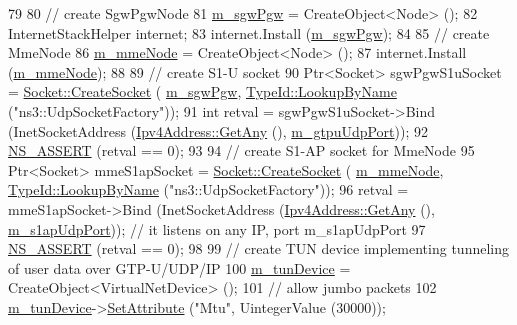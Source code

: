 \begin{DoxyCode}
79   
80   \textcolor{comment}{// create SgwPgwNode}
81   \hyperlink{classns3_1_1MmWavePointToPointEpcHelper_a164b7ce64e19868995296d492e7ddd21}{m\_sgwPgw} = CreateObject<Node> ();
82   InternetStackHelper internet;
83   internet.Install (\hyperlink{classns3_1_1MmWavePointToPointEpcHelper_a164b7ce64e19868995296d492e7ddd21}{m\_sgwPgw});
84 
85   \textcolor{comment}{// create MmeNode}
86   \hyperlink{classns3_1_1MmWavePointToPointEpcHelper_a4e2e32e1abb0ca817e30be4eb46ebfd0}{m\_mmeNode} = CreateObject<Node> ();
87   internet.Install (\hyperlink{classns3_1_1MmWavePointToPointEpcHelper_a4e2e32e1abb0ca817e30be4eb46ebfd0}{m\_mmeNode});
88   
89   \textcolor{comment}{// create S1-U socket}
90   Ptr<Socket> sgwPgwS1uSocket = \hyperlink{classns3_1_1Socket_ad448a62bb50ad3dbac59c879a885a8d2}{Socket::CreateSocket} (
      \hyperlink{classns3_1_1MmWavePointToPointEpcHelper_a164b7ce64e19868995296d492e7ddd21}{m\_sgwPgw}, \hyperlink{classns3_1_1TypeId_a119cf99c20931fdc294602cd360b180e}{TypeId::LookupByName} (\textcolor{stringliteral}{"ns3::UdpSocketFactory"}));
91   \textcolor{keywordtype}{int} retval = sgwPgwS1uSocket->Bind (InetSocketAddress (\hyperlink{classns3_1_1Ipv4Address_a7a39b330c8e701183a411d5779fca1a4}{Ipv4Address::GetAny} (), 
      \hyperlink{classns3_1_1MmWavePointToPointEpcHelper_af751b4022bf80a9ea76f18805534a9d0}{m\_gtpuUdpPort}));
92   \hyperlink{assert_8h_a6dccdb0de9b252f60088ce281c49d052}{NS\_ASSERT} (retval == 0);
93 
94   \textcolor{comment}{// create S1-AP socket for MmeNode}
95   Ptr<Socket> mmeS1apSocket = \hyperlink{classns3_1_1Socket_ad448a62bb50ad3dbac59c879a885a8d2}{Socket::CreateSocket} (
      \hyperlink{classns3_1_1MmWavePointToPointEpcHelper_a4e2e32e1abb0ca817e30be4eb46ebfd0}{m\_mmeNode}, \hyperlink{classns3_1_1TypeId_a119cf99c20931fdc294602cd360b180e}{TypeId::LookupByName} (\textcolor{stringliteral}{"ns3::UdpSocketFactory"}));
96   retval = mmeS1apSocket->Bind (InetSocketAddress (\hyperlink{classns3_1_1Ipv4Address_a7a39b330c8e701183a411d5779fca1a4}{Ipv4Address::GetAny} (), 
      \hyperlink{classns3_1_1MmWavePointToPointEpcHelper_ad1f7549ba3936b11b31d87caba866d76}{m\_s1apUdpPort})); \textcolor{comment}{// it listens on any IP, port m\_s1apUdpPort}
97   \hyperlink{assert_8h_a6dccdb0de9b252f60088ce281c49d052}{NS\_ASSERT} (retval == 0);
98 
99   \textcolor{comment}{// create TUN device implementing tunneling of user data over GTP-U/UDP/IP }
100   \hyperlink{classns3_1_1MmWavePointToPointEpcHelper_acdac8e4f1564927bfe05c2a04511394b}{m\_tunDevice} = CreateObject<VirtualNetDevice> ();
101   \textcolor{comment}{// allow jumbo packets}
102   \hyperlink{classns3_1_1MmWavePointToPointEpcHelper_acdac8e4f1564927bfe05c2a04511394b}{m\_tunDevice}->\hyperlink{classns3_1_1ObjectBase_ac60245d3ea4123bbc9b1d391f1f6592f}{SetAttribute} (\textcolor{stringliteral}{"Mtu"}, UintegerValue (30000));

\end{DoxyCode}
